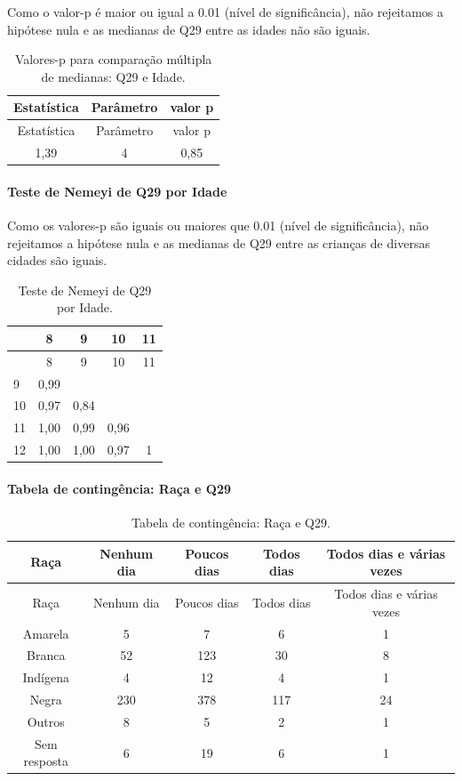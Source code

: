 \documentclass[]{article}
\let\oldparagraph\paragraph
\renewcommand{\paragraph}[1]{\oldparagraph{#1}\mbox{}}
\begin{document}
Como o valor-p é maior ou igual a 0.01 (nível de significância), não rejeitamos a hipótese nula e as medianas de Q29 entre as idades não são iguais.

\begin{longtable}[]{@{}ccc@{}}
\caption{\label{tab:unnamed-chunk-924}Valores-p para comparação múltipla de medianas: Q29 e Idade.}\tabularnewline
\toprule
Estatística & Parâmetro & valor p\tabularnewline
\midrule
\endfirsthead
\toprule
Estatística & Parâmetro & valor p\tabularnewline
\midrule
\endhead
1,39 & 4 & 0,85\tabularnewline
\bottomrule
\end{longtable}

\hypertarget{teste-de-nemeyi-de-q29-por-idade}{%
\paragraph{Teste de Nemeyi de Q29 por Idade}\label{teste-de-nemeyi-de-q29-por-idade}}

Como os valores-p são iguais ou maiores que 0.01 (nível de significância), não rejeitamos a hipótese nula e as medianas de Q29 entre as crianças de diversas cidades são iguais.

\begin{longtable}[]{@{}lcccc@{}}
\caption{\label{tab:unnamed-chunk-926}Teste de Nemeyi de Q29 por Idade.}\tabularnewline
\toprule
& 8 & 9 & 10 & 11\tabularnewline
\midrule
\endfirsthead
\toprule
& 8 & 9 & 10 & 11\tabularnewline
\midrule
\endhead
9 & 0,99 & & &\tabularnewline
10 & 0,97 & 0,84 & &\tabularnewline
11 & 1,00 & 0,99 & 0,96 &\tabularnewline
12 & 1,00 & 1,00 & 0,97 & 1\tabularnewline
\bottomrule
\end{longtable}

\cleardoublepage

\hypertarget{tabela-de-continguxeancia-rauxe7a-e-q29}{%
\paragraph{Tabela de contingência: Raça e Q29}\label{tabela-de-continguxeancia-rauxe7a-e-q29}}

\begin{longtable}[]{@{}ccccc@{}}
\caption{\label{tab:unnamed-chunk-927}Tabela de contingência: Raça e Q29.}\tabularnewline
\toprule
Raça & Nenhum dia & Poucos dias & Todos dias & Todos dias e várias vezes\tabularnewline
\midrule
\endfirsthead
\toprule
Raça & Nenhum dia & Poucos dias & Todos dias & Todos dias e várias vezes\tabularnewline
\midrule
\endhead
Amarela & 5 & 7 & 6 & 1\tabularnewline
Branca & 52 & 123 & 30 & 8\tabularnewline
Indígena & 4 & 12 & 4 & 1\tabularnewline
Negra & 230 & 378 & 117 & 24\tabularnewline
Outros & 8 & 5 & 2 & 1\tabularnewline
Sem resposta & 6 & 19 & 6 & 1\tabularnewline
\bottomrule
\end{longtable}
\end{document}
